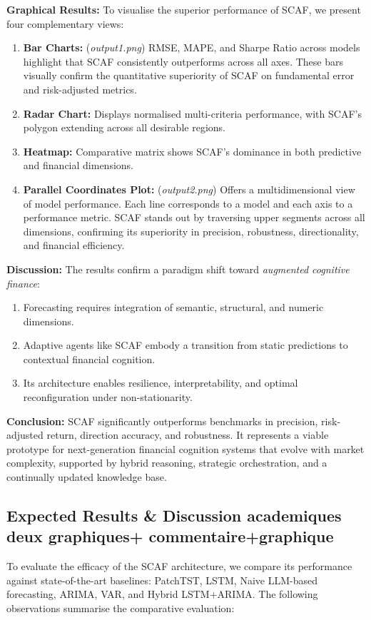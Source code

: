 \documentclass[conference]{IEEEtran}
\begin{document}
\textbf{Graphical Results:}
To visualise the superior performance of SCAF, we present four complementary views:
\begin{enumerate}
    \item \textbf{Bar Charts:} (\textit{output1.png}) RMSE, MAPE, and Sharpe Ratio across models highlight that SCAF consistently outperforms across all axes. These bars visually confirm the quantitative superiority of SCAF on fundamental error and risk-adjusted metrics.
    \item \textbf{Radar Chart:} Displays normalised multi-criteria performance, with SCAF's polygon extending across all desirable regions.
    \item \textbf{Heatmap:} Comparative matrix shows SCAF’s dominance in both predictive and financial dimensions.
    \item \textbf{Parallel Coordinates Plot:} (\textit{output2.png}) Offers a multidimensional view of model performance. Each line corresponds to a model and each axis to a performance metric. SCAF stands out by traversing upper segments across all dimensions, confirming its superiority in precision, robustness, directionality, and financial efficiency.
\end{enumerate}

\textbf{Discussion:}
The results confirm a paradigm shift toward \emph{augmented cognitive finance}:
\begin{enumerate}
    \item Forecasting requires integration of semantic, structural, and numeric dimensions.
    \item Adaptive agents like SCAF embody a transition from static predictions to contextual financial cognition.
    \item Its architecture enables resilience, interpretability, and optimal reconfiguration under non-stationarity.
\end{enumerate}

\textbf{Conclusion:}
SCAF significantly outperforms benchmarks in precision, risk-adjusted return, direction accuracy, and robustness. It represents a viable prototype for next-generation financial cognition systems that evolve with market complexity, supported by hybrid reasoning, strategic orchestration, and a continually updated knowledge base.
\subsection{Expected Results & Discussion academiques deux graphiques+ commentaire+graphique}
To evaluate the efficacy of the SCAF architecture, we compare its performance against state-of-the-art baselines: PatchTST, LSTM, Naive LLM-based forecasting, ARIMA, VAR, and Hybrid LSTM+ARIMA. The following observations summarise the comparative evaluation:
\end{document}
